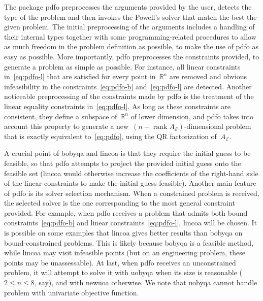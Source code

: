 \documentclass[11pt,draft]{article}
\numberwithin{equation}{section}
\DeclareMathOperator\rank{rank}
\def\R{\ensuremath{\mathbb{R}}}
\def\aeq{\ensuremath{A_{\scriptscriptstyle\mathcal{E}}}}
\begin{document}
The package \gls{pdfo} preprocesses the arguments provided by the user, detects the type of the problem and then invokes the Powell's solver that match the best the given problem.
The initial preprocessing of the arguments includes a handling of their internal types together with some programming-related procedures to allow as much freedom in the problem definition as possible, to make
the use of \gls{pdfo} as easy as possible.
More importantly, \gls{pdfo} preprocesses the constraints provided, to generate a problem as simple as possible.
For instance, all linear constraints in~\eqref{eq:pdfo-l} that are satisfied for every point in~$\R^n$ are removed and obvious infeasibility in the constraints~\eqref{eq:pdfo-b} and~\eqref{eq:pdfo-l} are detected.
Another noticeable preprocessing of the constraints made by \gls{pdfo} is the treatment of the linear equality constraints in~\eqref{eq:pdfo-l}.
As long as these constraints are consistent, they define a subspace of~$\R^n$ of lower dimension, and \gls{pdfo} takes into account this property to generate a new~$(n - \rank \aeq)$-dimensional problem that is exactly equivalent to~\eqref{eq:pdfo}, using the QR factorization of~$\aeq$.

A crucial point of \gls{bobyqa} and \gls{lincoa} is that they require the initial guess to be feasible, so that \gls{pdfo} attempts to project the provided initial guess onto the feasible set (\gls{lincoa} would otherwise increase the coefficients of the right-hand side of the linear constraints to make the initial guess feasible).
Another main feature of \gls{pdfo} is its solver selection mechanism.
When a constrained problem is received, the selected solver is the one corresponding to the most general constraint provided.
For example, when \gls{pdfo} receives a problem that admits both bound constraints~\eqref{eq:pdfo-b} and linear constraints~\eqref{eq:pdfo-l}, \gls{lincoa} will be chosen.
It is possible on some examples that \gls{lincoa} gives better results than \gls{bobyqa} on bound-constrained problems.
This is likely because \gls{bobyqa} is a feasible method, while \gls{lincoa} may visit infeasible points (but on an engineering problem, these points may be unassessable).
At last, when \gls{pdfo} receives an unconstrained problem, it will attempt to solve it with \gls{uobyqa} when its size is reasonable ($2 \le n \le 8$, say), and with \gls{newuoa} otherwise.
We note that \gls{uobyqa} cannot handle problem with univariate objective function.
\end{document}
